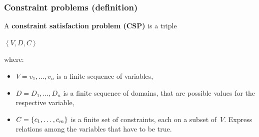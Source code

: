 \documentclass{beamer}
\newcommand{\Table}{\Constraint{Table}}
\begin{document}
\begin{frame}
  \frametitle{Constraint problems (definition)}
  \begin{definition}
    A \textbf{constraint satisfaction problem (CSP)} is a 
    triple\\
    \begin{center}
      $\left<V,D,C\right>$\\      
    \end{center}
    where: \\
    \begin{itemize}
      \item $V = v_1, \ldots, v_n$ is a finite sequence of variables,
      \item $D = D_1, \ldots, D_n$ is a finite sequence of domains, that are
        possible values for the respective variable,
      \item $C = \left\{c_1, \ldots, c_m\right\}$ is a finite set of constraints, 
        each on a subset of~$V$. 
        Express relations among the variables that have to be true.
    \end{itemize}
  \end{definition}
\end{frame}

  

\end{document}
